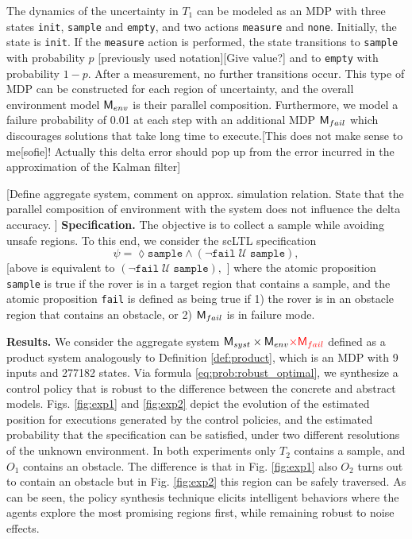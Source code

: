 \documentclass{ifacconf}
\newcommand{\red}[1]{{\color{red} #1}}
\begin{document}
The dynamics of the uncertainty in $T_1$ can be modeled as an MDP with three states \texttt{init}, \texttt{sample} and \texttt{empty}, and two actions \texttt{measure} and \texttt{none}. Initially, the state is \texttt{init}. If the \texttt{measure} action is performed, the state transitions to \texttt{sample} with probability $p$ \red{[previously used notation][Give value?]} and to \texttt{empty} with probability $1-p$. After a measurement, no further transitions occur. This type of MDP can be constructed for each region of uncertainty, and the overall environment model $\mathsf{M}_{env}$ is their parallel composition. \red{Furthermore, we model a failure probability of 0.01 at each step with an additional MDP $\mathsf{M}_{fail}$ which discourages solutions that take long time to execute.[This does not make sense to me[sofie]! Actually this delta error should pop up from the error incurred in the approximation of the Kalman filter]}

\red{[Define aggregate system, comment on approx. simulation relation. State that the parallel composition of environment with the system does  not influence the delta accuracy. ]}
\textbf{Specification.} The objective is to collect a sample while avoiding unsafe regions. To this end, we consider the scLTL specification
\begin{equation}
  \psi = \lozenge \texttt{sample} \land \left( \lnot \texttt{fail} \; \mathcal {U} \; \texttt{sample} \right),
\end{equation}
\red{[above is equivalent to $\left( \lnot \texttt{fail} \; \mathcal {U} \; \texttt{sample} \right),$ ]}
where the atomic proposition \texttt{sample} is true if the rover is in a target region that contains a sample, and the atomic proposition \texttt{fail} is defined as being true if 1) the rover is in an obstacle region that contains an obstacle, or 2) $\mathsf{M}_{fail}$ is in failure mode.

\textbf{Results.} We consider the aggregate system $\MDP_{syst} \times \MDP_{env} \red{\times \MDP_{fail}}$ defined as a product system analogously to Definition \ref{def:product}, which is an MDP with 9 inputs and 277182 states. Via formula \eqref{eq:prob:robust_optimal}, we synthesize a control policy that is robust to the difference between the concrete and abstract models. Figs. \ref{fig:exp1} and \ref{fig:exp2} depict the evolution of the estimated position for executions generated by the control policies, and the estimated probability that the specification can be satisfied, under two different resolutions of the unknown environment. In both experiments only $T_2$ contains a sample, and $O_1$ contains an obstacle. The difference is that in Fig. \ref{fig:exp1} also $O_2$ turns out to contain an obstacle but in Fig. \ref{fig:exp2} this region can be safely traversed. As can be seen, the policy synthesis technique elicits intelligent behaviors where the agents explore the most promising regions first, while remaining robust to noise effects.
\end{document}
